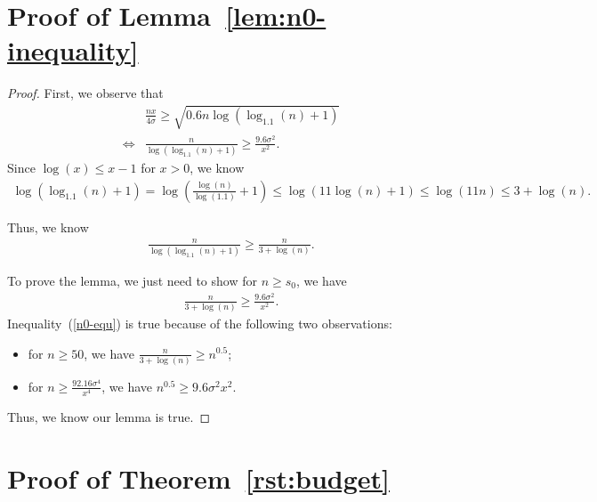 \section*{Proof of Lemma~\ref{lem:n0-inequality}}

\begin{proof}
First, we observe that
\begin{align}
&\frac{nx}{4\sigma}\geq \sqrt{0.6n\log(\log_{1.1}(n)+1)} \nonumber \\
\iff &\frac{n}{\log(\log_{1.1}(n)+1)}\geq \frac{9.6\sigma^2}{x^2}. \nonumber 
\end{align}
Since $\log(x)\leq x-1$ for $x>0$, we know 
\begin{align}
\log(\log_{1.1}(n)+1)=\log\left(\frac{\log(n)}{\log(1.1)}+1\right)\leq \log(11\log(n)+1)\leq \log(11n)\leq 3+\log(n). \nonumber
\end{align}

Thus, we know
\begin{align}
\frac{n}{\log(\log_{1.1}(n)+1)}\geq \frac{n}{3+\log(n)}. \nonumber 
\end{align}

To prove the lemma, we just need to show for $n\geq s_{0}$, we have
\begin{align}
\frac{n}{3+\log(n)}\geq \frac{9.6\sigma^2}{x^2}. \label{n0-equ}
\end{align}
Inequality~(\ref{n0-equ}) is true because of the following two observations:
\begin{itemize}
\item for $n\geq 50$, we have $\frac{n}{3+\log(n)}\geq n^{0.5}$;
\item for $n\geq \frac{92.16\sigma^4}{x^4}$, we have $n^{0.5}\geq {9.6\sigma^{2}}{x^{2}}$.
\end{itemize}

Thus, we know our lemma is true.

\end{proof}




\section*{Proof of Theorem~\ref{rst:budget}}

